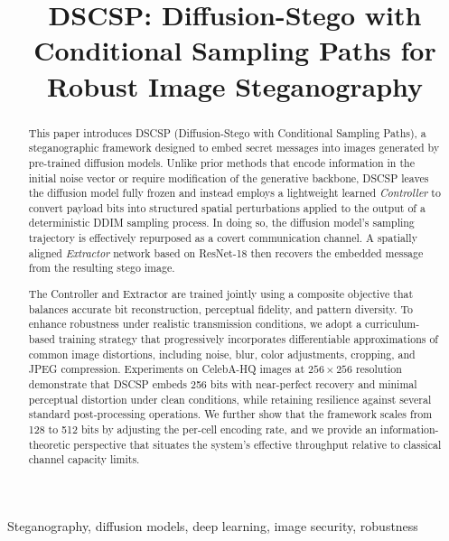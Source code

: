\documentclass[conference]{IEEEtran}
\title{DSCSP: Diffusion-Stego with Conditional Sampling Paths for Robust Image Steganography}
\author{
    \IEEEauthorblockN{Authors Omitted for Review}
    \IEEEauthorblockA{}
}
\begin{document}
\maketitle

\begin{abstract}
This paper introduces DSCSP (Diffusion-Stego with Conditional Sampling Paths), a steganographic framework designed to embed secret messages into images generated by pre-trained diffusion models.
Unlike prior methods that encode information in the initial noise vector or require modification of the generative backbone, DSCSP leaves the diffusion model fully frozen and instead employs a lightweight learned \emph{Controller} to convert payload bits into structured spatial perturbations applied to the output of a deterministic DDIM sampling process.
In doing so, the diffusion model’s sampling trajectory is effectively repurposed as a covert communication channel.
A spatially aligned \emph{Extractor} network based on ResNet-18 then recovers the embedded message from the resulting stego image.

The Controller and Extractor are trained jointly using a composite objective that balances accurate bit reconstruction, perceptual fidelity, and pattern diversity.
To enhance robustness under realistic transmission conditions, we adopt a curriculum-based training strategy that progressively incorporates differentiable approximations of common image distortions, including noise, blur, color adjustments, cropping, and JPEG compression.
Experiments on CelebA-HQ images at $256\times256$ resolution demonstrate that DSCSP embeds 256 bits with near-perfect recovery and minimal perceptual distortion under clean conditions, while retaining resilience against several standard post-processing operations.
We further show that the framework scales from 128 to 512 bits by adjusting the per-cell encoding rate, and we provide an information-theoretic perspective that situates the system’s effective throughput relative to classical channel capacity limits.
\end{abstract}

\begin{IEEEkeywords}
    Steganography, diffusion models, deep learning, image security, robustness
\end{IEEEkeywords}

\end{document}
